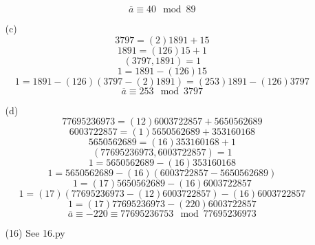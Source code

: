 \documentclass[12pt]{article}
\begin{document}
\begin{itemize}
\begin{itemize}
$$\overline{a} \equiv 40 \mod 89$$
\item[(c)]
$$3797 = (2)1891 + 15$$
$$1891 = (126)15 + 1$$
$$(3797, 1891) = 1$$
$$1 = 1891 - (126)15$$
$$1 = 1891 - (126)(3797 - (2)1891) = (253)1891 - (126)3797$$
$$\overline{a} \equiv 253 \mod 3797$$
\item[(d)]
$$77695236973 = (12)6003722857 + 5650562689$$
$$6003722857 = (1)5650562689 + 353160168$$
$$5650562689 = (16)353160168 + 1$$
$$(77695236973, 6003722857) = 1$$
$$1 = 5650562689 - (16)353160168$$
$$1 = 5650562689 - (16)(6003722857 - 5650562689)$$
$$1 = (17)5650562689 - (16)6003722857$$
$$1 = (17)(77695236973 - (12)6003722857) - (16)6003722857$$
$$1 = (17)77695236973 - (220)6003722857$$
$$\overline{a} \equiv -220 \equiv 77695236753 \mod 77695236973$$
\item[(16)] See 16.py
\end{itemize}
\end{itemize}
\end{document}

